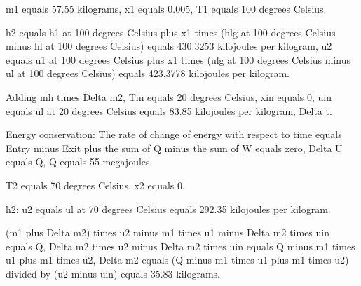 m1 equals 57.55 kilograms,
x1 equals 0.005,
T1 equals 100 degrees Celsius.

h2 equals h1 at 100 degrees Celsius plus x1 times (hlg at 100 degrees Celsius minus hl at 100 degrees Celsius) equals 430.3253 kilojoules per kilogram,
u2 equals u1 at 100 degrees Celsius plus x1 times (ulg at 100 degrees Celsius minus ul at 100 degrees Celsius) equals 423.3778 kilojoules per kilogram.

Adding mh times Delta m2, Tin equals 20 degrees Celsius, xin equals 0, uin equals ul at 20 degrees Celsius equals 83.85 kilojoules per kilogram, Delta t.

Energy conservation:
The rate of change of energy with respect to time equals Entry minus Exit plus the sum of Q minus the sum of W equals zero,
Delta U equals Q, Q equals 55 megajoules.

T2 equals 70 degrees Celsius,
x2 equals 0.

h2: u2 equals ul at 70 degrees Celsius equals 292.35 kilojoules per kilogram.

(m1 plus Delta m2) times u2 minus m1 times u1 minus Delta m2 times uin equals Q,
Delta m2 times u2 minus Delta m2 times uin equals Q minus m1 times u1 plus m1 times u2,
Delta m2 equals (Q minus m1 times u1 plus m1 times u2) divided by (u2 minus uin) equals 35.83 kilograms.